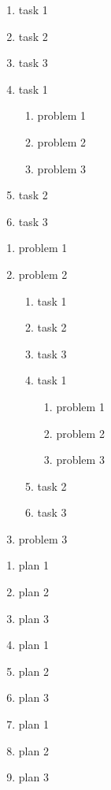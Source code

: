 \documentclass{weekly}
\begin{document}
    \thisweektask
    \begin{enumerate}
        \item task 1
        \item task 2
        \item task 3
        \item task 1
        \begin{enumerate}
            \item problem 1
            \item problem 2
            \item problem 3
        \end{enumerate}
        \item task 2
        \item task 3
    \end{enumerate}
    \thisweekproblem
    \begin{enumerate}
        \item problem 1
        \item problem 2
        \begin{enumerate}
            \item task 1
            \item task 2
            \item task 3
            \item task 1
            \begin{enumerate}
                \item problem 1
                \item problem 2
                \item problem 3
            \end{enumerate}
            \item task 2
            \item task 3
        \end{enumerate}
        \item problem 3
    \end{enumerate}
    \nextweekplan
    \begin{enumerate}
        \item plan 1
        \item plan 2
        \item plan 3
        \item plan 1
        \item plan 2
        \item plan 3
        \item plan 1
        \item plan 2
        \item plan 3
    \end{enumerate}
\end{document}
